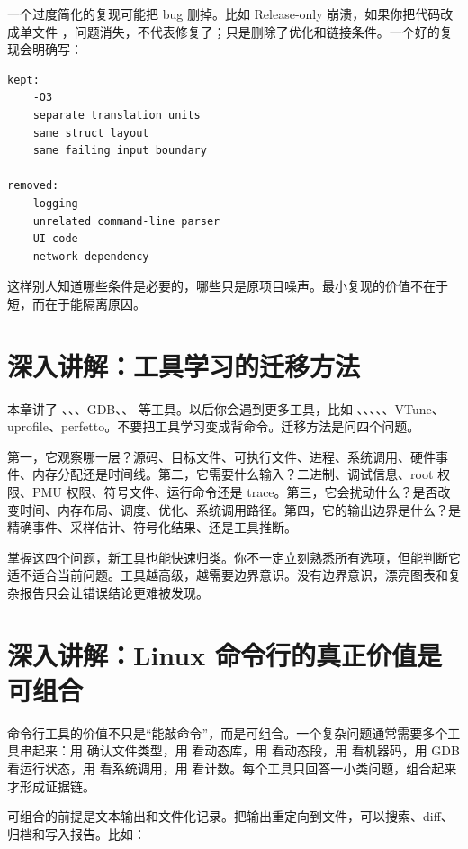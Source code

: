 一个过度简化的复现可能把 bug 删掉。比如 Release-only 崩溃，如果你把代码改成单文件 ，问题消失，不代表修复了；只是删除了优化和链接条件。一个好的复现会明确写：

\begin{lstlisting}
kept:
    -O3
    separate translation units
    same struct layout
    same failing input boundary

removed:
    logging
    unrelated command-line parser
    UI code
    network dependency
\end{lstlisting}

这样别人知道哪些条件是必要的，哪些只是原项目噪声。最小复现的价值不在于短，而在于能隔离原因。

\section{深入讲解：工具学习的迁移方法}

本章讲了 、、、GDB、、 等工具。以后你会遇到更多工具，比如 、、、、、VTune、uprofile、perfetto。不要把工具学习变成背命令。迁移方法是问四个问题。

第一，它观察哪一层？源码、目标文件、可执行文件、进程、系统调用、硬件事件、内存分配还是时间线。第二，它需要什么输入？二进制、调试信息、root 权限、PMU 权限、符号文件、运行命令还是 trace。第三，它会扰动什么？是否改变时间、内存布局、调度、优化、系统调用路径。第四，它的输出边界是什么？是精确事件、采样估计、符号化结果、还是工具推断。

掌握这四个问题，新工具也能快速归类。你不一定立刻熟悉所有选项，但能判断它适不适合当前问题。工具越高级，越需要边界意识。没有边界意识，漂亮图表和复杂报告只会让错误结论更难被发现。

\section{深入讲解：Linux 命令行的真正价值是可组合}

命令行工具的价值不只是“能敲命令”，而是可组合。一个复杂问题通常需要多个工具串起来：用  确认文件类型，用  看动态库，用  看动态段，用  看机器码，用 GDB 看运行状态，用  看系统调用，用  看计数。每个工具只回答一小类问题，组合起来才形成证据链。

可组合的前提是文本输出和文件化记录。把输出重定向到文件，可以搜索、diff、归档和写入报告。比如：

